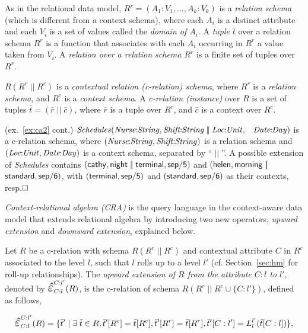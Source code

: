 \documentclass[format=acmsmall, review=false, screen=true]{acmart}
\newcommand{\upext}[3]{\scalebox{1.5}{\ensuremath{\hat{\varepsilon}}}_{#1}^{#2}(#3)}
\newcommand{\boxtheorem}{\ensuremath{\hfill \Box}}
\newcommand{\nit}[1]{{\it #1}}
\newcommand{\vectt}[1]{\bar{#1}}
\begin{document}
{As in the relational data model, $R^r=(A_1\!:\!V_1,...,A_k\!:\!V_k)$ is a {\em relation schema} (which is different from a context schema), where each $A_i$ is a distinct attribute and each $V_i$ is a set of values called the {\em domain of $A_i$}. A {\em tuple} $\vectt{t}$ over a relation schema $R^r$ is a function that associates with each $A_i$ occurring in $R^r$ a value taken from $V_i$. A {\em relation over a relation schema $R^r$} is a finite set of tuples over $R^r$.

$R(R^r\;\!|\!|\;R^c)$ is a {\em contextual relation (c-relation) schema}, where $R^r$ is a {\em relation schema}, and $R^c$ is a {\em context schema}. A {\em c-relation (instance)} over $R$ is a set of tuples $\vectt{t}=(\vectt{r}\;\!|\!|\;\vectt{c})$, where $\vectt{r}$ is a tuple over $R^r$, and $\vectt{c}$ is a context over $R^c$.

\begin{example} \label{ex:ca3} (ex.~\ref{ex:ca2} cont.) $\nit{Schedules}(\nit{Nurse}\!\!:\!\!\nit{String},\nit{Shift}\!\!:\!\!\nit{String}\;|\!|\;\nit{Loc}\!\!:\!\!\nit{Unit},$ \ $\nit{Date}\!\!:\!\!\nit{Day})$ is a c-relation schema, where $(\nit{Nurse}\!\!:\!\!\nit{String},\nit{Shift}\!\!:\!\!\nit{String})$ is a relation schema and $(\nit{Loc}\!\!:\!\!\nit{Unit},\nit{Date}\!\!:\!\!\nit{Day})$ is a context schema, separated by ``$\;|\!|\;$''. A possible extension of \nit{Schedules} contains $({\sf cathy},{\sf night}\;|\!|\;{\sf terminal},{\sf sep/5})$ and $({\sf helen},{\sf morning}\;|\!|\;$ \ ${\sf standard},{\sf sep/6})$, with $({\sf terminal},{\sf sep/5})$ and $({\sf standard},{\sf sep/6})$ as their contexts, resp.\boxtheorem \end{example}

{\em Context-relational algebra (CRA)} is the query language in the context-aware data model that extends relational algebra by introducing two new operators, {\em upward extension} and {\em downward extension}, explained below.

Let $R$ be a c-relation with schema $R(R^r\;\!|\!|\;R^c)$ and contextual attribute $C$ in $R^c$ associated to the level $l$, such that $l$ rolls up to a level $l'$ (cf. Section~\ref{sec:hm} for roll-up relationships). The {\em upward extension of $R$ from the attribute $C:l$ to $l'$}, denoted by $\upext{C:l}{C:l'}{R}$, is the c-relation of schema $R(R^r\;\!|\!|\;R^c \cup \{C:l'\})$, defined as follows,

\vspace{-4mm}
\begin{align*}%
\upext{C:l}{C:l'}{R}=\{\vectt{t}'\;|\;\exists \;\vectt{t} \in R, \vectt{t}'[R^c]=\vectt{t}[R^c], \vectt{t}'[R^r]=\vectt{t}[R^r], \vectt{t}'[C:l']=L_{l}^{l'}(\vectt{t}[C:l])\},
\end{align*}
\vspace{-4mm}

}
\end{document}
